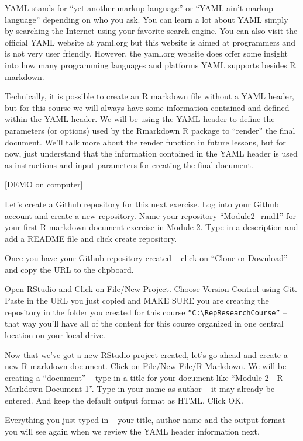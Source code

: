 \documentclass[
]{book}
\begin{document}
YAML stands for ``yet another markup language'' or ``YAML ain't markup language'' depending on who you ask. You can learn a lot about YAML simply by searching the Internet using your favorite search engine. You can also visit the official YAML website at yaml.org but this website is aimed at programmers and is not very user friendly. However, the yaml.org website does offer some insight into how many programming languages and platforms YAML supports besides R markdown.

Technically, it is possible to create an R markdown file without a YAML header, but for this course we will always have some information contained and defined within the YAML header. We will be using the YAML header to define the parameters (or options) used by the Rmarkdown R package to ``render'' the final document. We'll talk more about the render function in future lessons, but for now, just understand that the information contained in the YAML header is used as instructions and input parameters for creating the final document.

{[}DEMO on computer{]}

Let's create a Github repository for this next exercise. Log into your Github account and create a new repository. Name your repository ``Module2\_rmd1'' for your first R markdown document exercise in Module 2. Type in a description and add a README file and click create repository.

Once you have your Github repository created -- click on ``Clone or Download'' and copy the URL to the clipboard.

Open RStudio and Click on File/New Project. Choose Version Control using Git. Paste in the URL you just copied and MAKE SURE you are creating the repository in the folder you created for this course \texttt{“C:\textbackslash{}RepResearchCourse”} -- that way you'll have all of the content for this course organized in one central location on your local drive.

Now that we've got a new RStudio project created, let's go ahead and create a new R markdown document. Click on File/New File/R Markdown. We will be creating a ``document'' -- type in a title for your document like ``Module 2 - R Markdown Document 1''. Type in your name as author -- it may already be entered. And keep the default output format as HTML. Click OK.

Everything you just typed in -- your title, author name and the output format -- you will see again when we review the YAML header information next.
\end{document}
